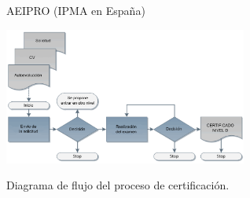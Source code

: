\begin{frame}[allowframebreaks]{AEIPRO (IPMA en España)}
\begin{enumerate}
		\framebreak
		
		\begin{center}
			\includegraphics[height=4.5cm]{figuras/procesod.png}
			
			Diagrama de flujo del proceso de certificación.
		\end{center}
		
	\end{enumerate}
	
\end{frame}

